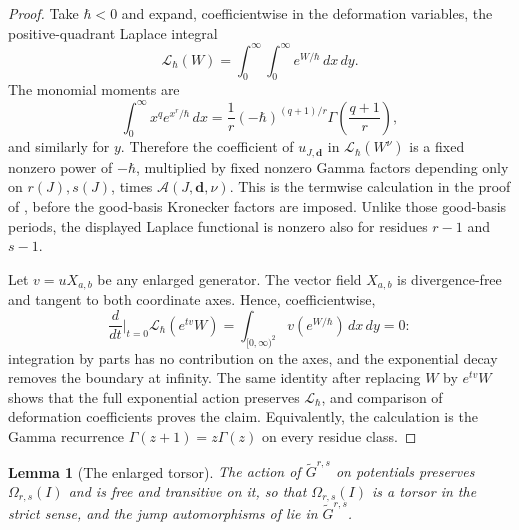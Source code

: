\documentclass[11pt]{amsart}
\newtheorem{lemma}[theorem]{Lemma}
\theoremstyle{definition}
\theoremstyle{remark}
\newcommand{\Ascr}{\mathcal{A}}
\newcommand{\Om}{\Omega_{r,s}}
\begin{document}
\begin{proof}
Take $\hbar<0$ and expand, coefficientwise in the deformation variables, the
positive-quadrant Laplace integral
\[
 \mathcal L_\hbar(W)=
 \int_{0}^{\infty}\!\int_{0}^{\infty} e^{W/\hbar}\,dx\,dy .
\]
The monomial moments are
\[
 \int_{0}^{\infty}x^q e^{x^r/\hbar}\,dx
 =\frac1r(-\hbar)^{(q+1)/r}
   \Gamma\!\left(\frac{q+1}{r}\right),
\]
and similarly for $y$.  Therefore the coefficient of
$u_{J,\mathbf d}$ in $\mathcal L_\hbar(W^\nu)$ is a fixed nonzero power of
$-\hbar$, multiplied by fixed nonzero Gamma factors depending only on
$r(J),s(J)$, times $\Ascr(J,\mathbf d,\nu)$.  This is the termwise
calculation in the proof of \cite[Thm.~4.9]{GKT}, before the good-basis
Kronecker factors are imposed.  Unlike those good-basis periods, the displayed
Laplace functional is nonzero also for residues $r-1$ and $s-1$.

Let $v=uX_{a,b}$ be any enlarged generator.  The vector field $X_{a,b}$ is
divergence-free and tangent to both coordinate axes.  Hence, coefficientwise,
\[
 \frac{d}{dt}\bigg|_{t=0}\mathcal L_\hbar(e^{tv}W)
 =\int_{[0,\infty)^2}v(e^{W/\hbar})\,dx\,dy=0:
\]
integration by parts has no contribution on the axes, and the exponential
decay removes the boundary at infinity.  The same identity after replacing
$W$ by $e^{tv}W$ shows that the full exponential action preserves
$\mathcal L_\hbar$, and comparison of deformation coefficients proves the
claim.  Equivalently, the calculation is the Gamma recurrence
$\Gamma(z+1)=z\Gamma(z)$ on every residue class.
\end{proof}

\begin{lemma}[The enlarged torsor]
\label{lem:enlarged}
The action of $\widetilde G^{r,s}$ on potentials preserves $\Om(I)$ and is
\emph{free} and transitive on it, so that $\Om(I)$ is a torsor in the strict sense,
and the jump automorphisms of \cite[Thm.~5.9]{GKT} lie in $\widetilde G^{r,s}$.
\end{lemma}
\end{document}
